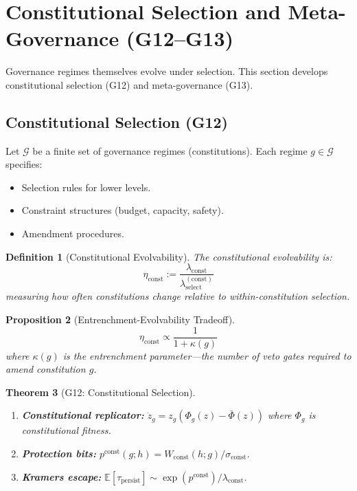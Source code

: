 \documentclass[12pt]{article}
\newtheorem{theorem}{Theorem}[section]
\newtheorem{proposition}[theorem]{Proposition}
\newtheorem{definition}[theorem]{Definition}
\newcommand{\E}{\mathbb{E}}
\begin{document}

\section{Constitutional Selection and Meta-Governance (G12--G13)}
\label{sec:g12-g13}

Governance regimes themselves evolve under selection. This section develops constitutional selection (G12) and meta-governance (G13).

\subsection{Constitutional Selection (G12)}

Let $\mathcal{G}$ be a finite set of governance regimes (constitutions). Each regime $g \in \mathcal{G}$ specifies:
\begin{itemize}
    \item Selection rules for lower levels.
    \item Constraint structures (budget, capacity, safety).
    \item Amendment procedures.
\end{itemize}

\begin{definition}[Constitutional Evolvability]
The \emph{constitutional evolvability} is:
\[
\eta_{\mathrm{const}} := \frac{\lambda_{\mathrm{const}}}{\lambda_{\mathrm{select}}^{(\mathrm{const})}}
\]
measuring how often constitutions change relative to within-constitution selection.
\end{definition}

\begin{proposition}[Entrenchment-Evolvability Tradeoff]
\label{prop:entrenchment}
\[
\eta_{\mathrm{const}} \propto \frac{1}{1 + \kappa(g)}
\]
where $\kappa(g)$ is the \emph{entrenchment parameter}---the number of veto gates required to amend constitution $g$.
\end{proposition}

\begin{theorem}[G12: Constitutional Selection]
\label{thm:g12}
\begin{enumerate}
    \item[(a)] \textbf{Constitutional replicator:} $\dot{z}_g = z_g(\Phi_g(z) - \bar{\Phi}(z))$ where $\Phi_g$ is constitutional fitness.
    \item[(b)] \textbf{Protection bits:} $p^{\mathrm{const}}(g; h) = W_{\mathrm{const}}(h; g) / \sigma_{\mathrm{const}}$.
    \item[(c)] \textbf{Kramers escape:} $\E[\tau_{\mathrm{persist}}] \sim \exp(p^{\mathrm{const}}) / \lambda_{\mathrm{const}}$.
\end{enumerate}
\end{theorem}
\end{document}
